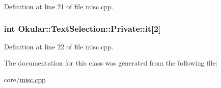 Definition at line 21 of file misc.\+cpp.

\hypertarget{classTextSelection_1_1Private_a6799836d63bfdf108cf1c52f1cf53933}{
\subsubsection[{it}]{\setlength{\rightskip}{0pt plus 5cm}int Okular\+::\+Text\+Selection\+::\+Private\+::it\mbox{[}2\mbox{]}}}\label{classTextSelection_1_1Private_a6799836d63bfdf108cf1c52f1cf53933}


Definition at line 22 of file misc.\+cpp.



The documentation for this class was generated from the following file\+:\begin{DoxyCompactItemize}
\item 
core/\hyperlink{misc_8cpp}{misc.\+cpp}\end{DoxyCompactItemize}
